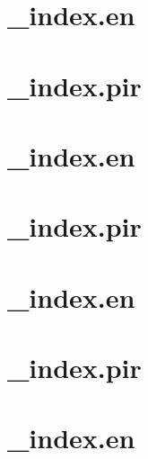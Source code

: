 \let\mypdfximage\pdfximage\def\pdfximage{\immediate\mypdfximage}\documentclass[twoside]{book}
\newcommand{\+}{\discretionary{\mbox{\scriptsize$\hookleftarrow$}}{}{}}
\begin{document}
\chapter{\+\_\+index.\+en}
\label{md_themes_relearn_exampleSite_content_dev_contributing__index_en}

\chapter{\+\_\+index.\+pir}
\label{md_themes_relearn_exampleSite_content_dev_contributing__index_pir}

\chapter{\+\_\+index.\+en}
\label{md_themes_relearn_exampleSite_content_dev_maintaining__index_en}

\chapter{\+\_\+index.\+pir}
\label{md_themes_relearn_exampleSite_content_dev_maintaining__index_pir}

\chapter{\+\_\+index.\+en}
\label{md_themes_relearn_exampleSite_content_dev_screenshots__index_en}

\chapter{\+\_\+index.\+pir}
\label{md_themes_relearn_exampleSite_content_dev_screenshots__index_pir}

\chapter{\+\_\+index.\+en}
\label{md_themes_relearn_exampleSite_content_more__index_en}

\end{document}
